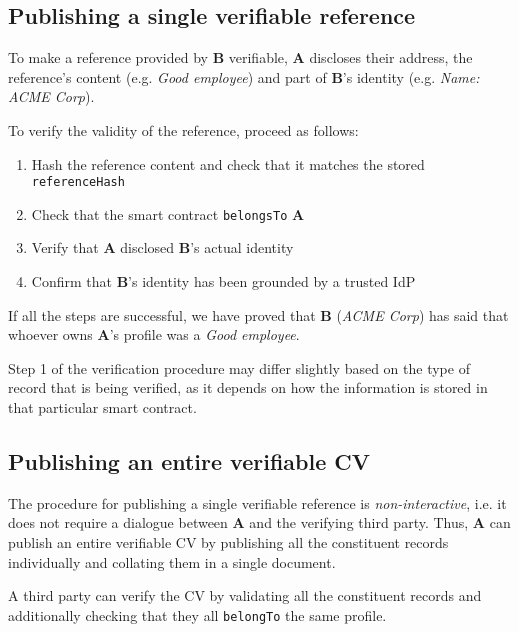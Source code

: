 \documentclass[a4paper, bibliography=totoc, titlepage=false]{scrartcl}
\begin{document}
\subsection{Publishing a single verifiable reference}

To make a reference provided by \textbf{B} verifiable, \textbf{A} discloses their address, the reference's content (e.g. \emph{Good employee}) and part of \textbf{B}'s identity (e.g. \emph{Name: ACME Corp}).

\vspace{2.5mm}
To verify the validity of the reference, proceed as follows:

\begin{enumerate}
	\item Hash the reference content and check that it matches the stored \texttt{referenceHash}
	\item Check that the smart contract \texttt{belongsTo} \textbf{A}
	\item Verify that \textbf{A} disclosed \textbf{B}'s actual identity
	\item Confirm that \textbf{B}'s identity has been grounded by a trusted IdP
\end{enumerate}

If all the steps are successful, we have proved that \textbf{B} (\emph{ACME Corp}) has said that whoever owns \textbf{A}'s profile was a \emph{Good employee}.

Step 1 of the verification procedure may differ slightly based on the type of record that is being verified, as it depends on how the information is stored in that particular smart contract.

\subsection{Publishing an entire verifiable CV}

The procedure for publishing a single verifiable reference is \emph{non-interactive}, i.e. it does not require a dialogue between \textbf{A} and the verifying third party. Thus, \textbf{A} can publish an entire verifiable CV by publishing all the constituent records individually and collating them in a single document.

A third party can verify the CV by validating all the constituent records and additionally checking that they all \texttt{belongTo} the same profile.


\printbibliography
\end{document}

